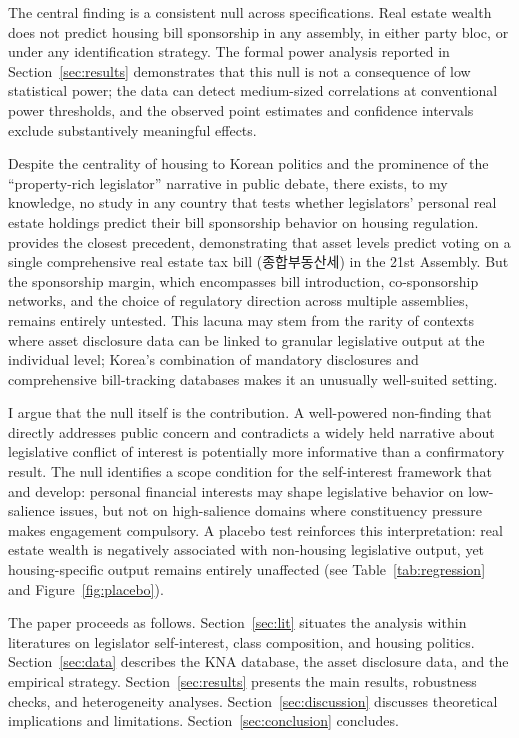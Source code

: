 \documentclass[11pt]{article}
\begin{document}
The central finding is a consistent null across specifications. Real estate wealth does not predict housing bill sponsorship in any assembly, in either party bloc, or under any identification strategy. The formal power analysis reported in Section~\ref{sec:results} demonstrates that this null is not a consequence of low statistical power; the data can detect medium-sized correlations at conventional power thresholds, and the observed point estimates and confidence intervals exclude substantively meaningful effects.

Despite the centrality of housing to Korean politics and the prominence of the ``property-rich legislator'' narrative in public debate, there exists, to my knowledge, no study in any country that tests whether legislators' personal real estate holdings predict their bill sponsorship behavior on housing regulation. \citet{seo2025} provides the closest precedent, demonstrating that asset levels predict voting on a single comprehensive real estate tax bill (종합부동산세) in the 21st Assembly. But the sponsorship margin, which encompasses bill introduction, co-sponsorship networks, and the choice of regulatory direction across multiple assemblies, remains entirely untested. This lacuna may stem from the rarity of contexts where asset disclosure data can be linked to granular legislative output at the individual level; Korea's combination of mandatory disclosures and comprehensive bill-tracking databases makes it an unusually well-suited setting.

I argue that the null itself is the contribution. A well-powered non-finding that directly addresses public concern and contradicts a widely held narrative about legislative conflict of interest is potentially more informative than a confirmatory result. The null identifies a scope condition for the self-interest framework that \citet{carneslupu2023} and \citet{lupu2015} develop: personal financial interests may shape legislative behavior on low-salience issues, but not on high-salience domains where constituency pressure makes engagement compulsory. A placebo test reinforces this interpretation: real estate wealth is negatively associated with non-housing legislative output, yet housing-specific output remains entirely unaffected (see Table~\ref{tab:regression} and Figure~\ref{fig:placebo}).

The paper proceeds as follows. Section~\ref{sec:lit} situates the analysis within literatures on legislator self-interest, class composition, and housing politics. Section~\ref{sec:data} describes the KNA database, the asset disclosure data, and the empirical strategy. Section~\ref{sec:results} presents the main results, robustness checks, and heterogeneity analyses. Section~\ref{sec:discussion} discusses theoretical implications and limitations. Section~\ref{sec:conclusion} concludes.
\end{document}
